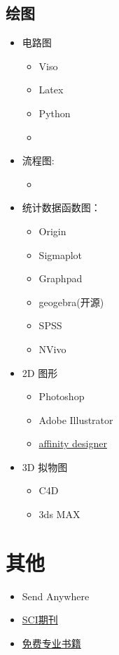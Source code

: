 \documentclass[UTF8]{ctexbook}
\begin{document}
\subsection{绘图}
\begin{itemize}
	\item 电路图
	      \begin{itemize}
		      \item Viso
		      \item Latex
		      \item Python
		      \item
	      \end{itemize}
	\item 流程图:
	      \begin{itemize}
		      \item
	      \end{itemize}
	\item 统计数据函数图：
	      \begin{itemize}
		      \item Origin
		      \item Sigmaplot
		      \item Graphpad
		      \item geogebra(开源)
		      \item SPSS
		      \item NVivo
	      \end{itemize}
	\item 2D 图形
	      \begin{itemize}
		      \item Photoshop
		      \item Adobe Illustrator
		      \item \href{https://affinity.serif.com/zh-cn/designer/}{affinity designer}
	      \end{itemize}
	\item 3D 拟物图
	      \begin{itemize}
		      \item C4D
		      \item 3ds MAX
	      \end{itemize}
\end{itemize}

\section{其他}
\begin{itemize}
	\item Send Anywhere
	\item \href{https://www.scimagojr.com}{SCI期刊}
	\item \href{http://libgen.io}{免费专业书籍}
\end{itemize}
\end{document}
